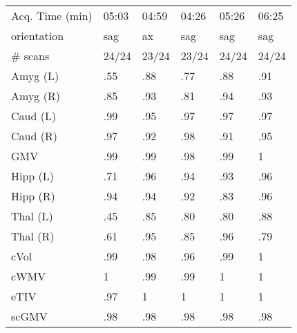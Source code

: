 \begin{table}
\begin{tabular}{llllll}
Acq. Time (min)       &           05:03 &           04:59 &           04:26 &           05:26 &           06:25 \\
orientation           &                sag &                 ax &                sag &                sag &                sag \\
\# scans & 24/24 & 23/24 & 23/24 & 24/24 & 24/24 \\
\midrule
Amyg (L)              &               .55 &               .88 &               .77 &               .88 &               .91 \\
Amyg (R)              &               .85 &               .93 &               .81 &               .94 &               .93 \\
Caud (L)              &               .99 &               .95 &               .97 &               .97 &               .97 \\
Caud (R)              &               .97 &               .92 &               .98 &               .91 &               .95 \\
GMV                   &               .99 &               .99 &               .98 &               .99 &               1   \\
Hipp (L)              &               .71 &               .96 &               .94 &               .93 &               .96 \\
Hipp (R)              &               .94 &               .94 &               .92 &               .83 &               .96 \\
Thal (L)              &               .45 &               .85 &               .80 &               .80 &               .88 \\
Thal (R)              &               .61 &               .95 &               .85 &               .96 &               .79 \\
cVol                  &               .99 &               .98 &               .96 &               .99 &               1   \\
cWMV                  &               1   &               .99 &               .99 &               1   &               1   \\
eTIV                  &               .97 &               1   &               1   &               1   &               1   \\
scGMV                 &               .98 &               .98 &               .98 &               .98 &               .98 \\
\bottomrule
\end{tabular}

\end{table}
